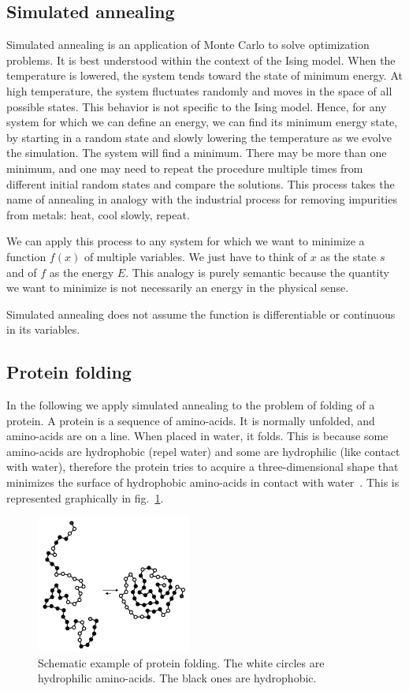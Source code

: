\documentclass[justified,sixbynine]{tufte-book}
\theoremstyle{plain}%
\theoremstyle{definition}
\theoremstyle{remark}
\begin{document}
\begin{fullwidth}
\section{Simulated annealing}

Simulated annealing is an application of Monte Carlo to solve optimization problems. It is best understood within the context of the Ising model. When the temperature is lowered, the system tends toward the state of minimum energy. At high temperature, the system fluctuates randomly and moves in the space of all possible states. This behavior is not specific to the Ising model. Hence, for any system for which we can define an energy, we can find its minimum energy state, by starting in a random state and slowly lowering the temperature as we evolve the simulation. The system will find a minimum. There may be more than one minimum, and one may need to repeat the procedure multiple times from different initial random states and compare the solutions. This process takes the name of annealing in analogy with the industrial process for removing impurities from metals: heat, cool slowly, repeat.

We can apply this process to any system for which we want to minimize a function $f(x)$ of multiple variables. We just have to think of $x$ as the state $s$ and of $f$ as the energy $E$. This analogy is purely semantic because the quantity we want to minimize is not necessarily an energy in the physical sense.

Simulated annealing does not assume the function is differentiable or continuous in its variables.

\subsection{Protein folding}

In the following we apply simulated annealing to the problem of folding of a protein.
A protein is a sequence of amino-acids. It is normally unfolded, and amino-acids are on a line. When placed in water, it folds. This is because some amino-acids are hydrophobic (repel water) and some are hydrophilic (like contact with water), therefore the protein tries to acquire a three-dimensional shape that minimizes the surface of hydrophobic amino-acids in contact with water~\cite{folding}. This is represented graphically in fig.~\ref{folding}.

\begin{figure}[ht]
\centering\includegraphics[width=2in]{images/folding.png}
\caption{Schematic example of protein folding. The white circles are hydrophilic amino-acids. The black ones are hydrophobic.\label{folding}}
\end{figure}


\end{fullwidth}
\end{document}
